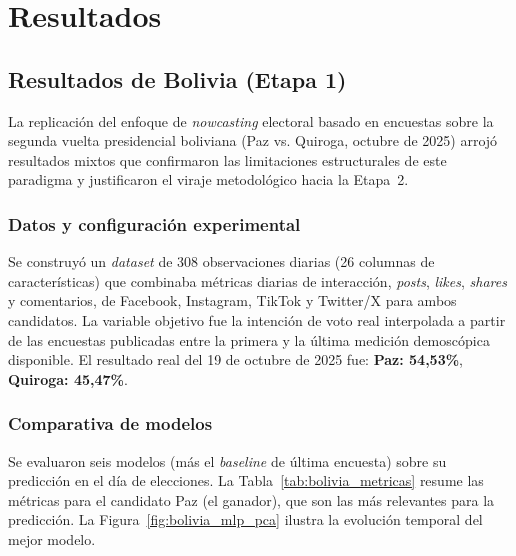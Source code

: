 

\chapter{Resultados}\label{ch:resultados}

\section{Resultados de Bolivia (Etapa 1)}

La replicación del enfoque de \textit{nowcasting} electoral basado en encuestas sobre la segunda vuelta presidencial boliviana (Paz vs. Quiroga, octubre de 2025) arrojó resultados mixtos que confirmaron las limitaciones estructurales de este paradigma y justificaron el viraje metodológico hacia la Etapa~2.

\subsection*{Datos y configuración experimental}

Se construyó un \textit{dataset} de 308 observaciones diarias (26 columnas de características) que combinaba métricas diarias de interacción, \textit{posts}, \textit{likes}, \textit{shares} y comentarios, de Facebook, Instagram, TikTok y Twitter/X para ambos candidatos. La variable objetivo fue la intención de voto real interpolada a partir de las encuestas publicadas entre la primera y la última medición demoscópica disponible. El resultado real del 19 de octubre de 2025 fue: \textbf{Paz: 54{,}53\%}, \textbf{Quiroga: 45{,}47\%}.

\subsection*{Comparativa de modelos}

Se evaluaron seis modelos (más el \textit{baseline} de última encuesta) sobre su predicción en el día de elecciones. La Tabla~\ref{tab:bolivia_metricas} resume las métricas para el candidato Paz (el ganador), que son las más relevantes para la predicción. La Figura~\ref{fig:bolivia_mlp_pca} ilustra la evolución temporal del mejor modelo.

